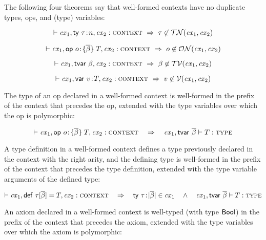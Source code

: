 The following four theorems say that well-formed contexts have no duplicate
types, ops, and (type) variables:

\begin{theorem}\label{thm-cx-uniq-typ}
\[
\vdash\mathit{cx}_1,\mathsf{ty}\ \tau\!:\!n,\mathit{cx}_2:\textsc{context}\ \Rightarrow\ \tau\not\in\mathcal{TN}(\mathit{cx}_1,\mathit{cx}_2)
\]
\end{theorem}

\begin{theorem}\label{thm-cx-uniq-op}
\[
\vdash\mathit{cx}_1,\mathsf{op}\ o\!:\!\{\overline{\beta}\}\;T,\mathit{cx}_2:\textsc{context}\ \Rightarrow\ o\not\in\mathcal{ON}(\mathit{cx}_1,\mathit{cx}_2)
\]
\end{theorem}

\begin{theorem}\label{thm-cx-uniq-tvar}
\[
\vdash\mathit{cx}_1,\mathsf{tvar}\ \beta,\mathit{cx}_2:\textsc{context}\ \Rightarrow\ \beta\not\in\mathcal{TV}(\mathit{cx}_1,\mathit{cx}_2)
\]
\end{theorem}

\begin{theorem}\label{thm-cx-uniq-var}
\[
\vdash\mathit{cx}_1,\mathsf{var}\ v\!:\!T,\mathit{cx}_2:\textsc{context}\ \Rightarrow\ v\not\in\mathcal{V}(\mathit{cx}_1,\mathit{cx}_2)
\]
\end{theorem}

The type of an op declared in a well-formed context is well-formed in the
prefix of the context that precedes the op, extended with the type variables
over which the op is polymorphic:

\begin{theorem}\label{thm-op-type-wf}
\[
\cxwf{\cx_1,\odecO,\cx_2}\ \ \IMPLIES\ \ 
\isty{\snoc{\cx_1}{\tvdec{\tvarS}}}{\typ}
\]
\end{theorem}

A type definition in a well-formed context defines a type previously declared
in the context with the right arity, and the defining type is well-formed in
the prefix of the context that precedes the type definition, extended with the
type variable arguments of the defined type:

\begin{theorem}\label{thm-tdef-wf}
\[
\vdash\mathit{cx}_1,\mathsf{def}\ \tau[\overline{\beta}]=T,\mathit{cx}_2:\textsc{context}
\ \ \ \Rightarrow\ \ \
\mathsf{ty}\ \tau\!:\!|\overline{\beta}|\in\mathit{cx}_1
\ \ \ \wedge\ \ \
\mathit{cx}_1,\mathsf{tvar}\ \overline{\beta}\vdash T:\textsc{type}
\]
\end{theorem}

An axiom declared in a well-formed context is well-typed (with type $\mathsf{Bool}$)
in the prefix of the context that precedes the axiom, extended with the type
variables over which the axiom is polymorphic:

